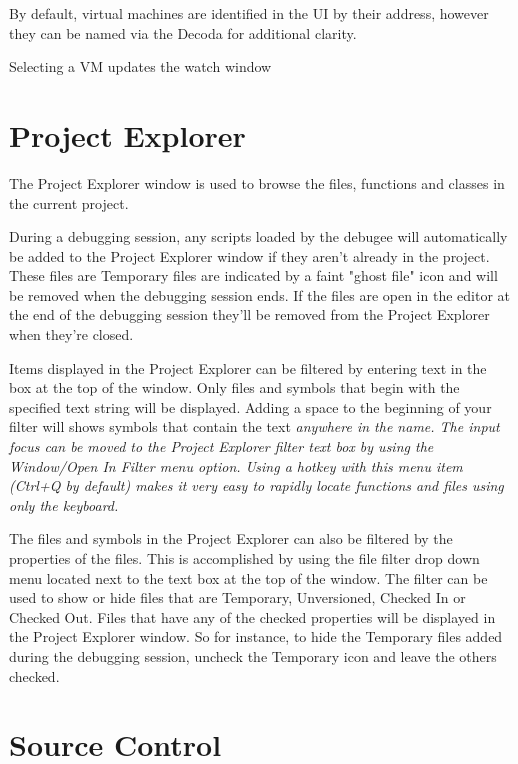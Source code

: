 By default, virtual machines are identified in the UI by their address, however they
can be named via the Decoda  for additional clarity.

Selecting a VM updates the watch window

\section{Project Explorer}\label{project_explorer}


The Project Explorer window is used to browse the files, functions and classes in
the current project.

During a debugging session, any scripts loaded by the debugee will automatically
be added to the Project Explorer window if they aren't already in the project. These
files are Temporary files are indicated by a faint "ghost file" icon and will be removed
when the debugging session ends.  If the files are open in the editor at the end of the
debugging session they'll be removed from the Project Explorer when they're closed.

Items displayed in the Project Explorer can be filtered by entering text in the box
at the top of the window. Only files and symbols that begin with the specified text
string will be displayed. Adding a space to the beginning of your filter will
shows symbols that contain the text \em{anywhere} in the name.  The input focus
can be moved to the Project Explorer filter text box by using the Window/Open In Filter
menu option. Using a hotkey with this menu item (Ctrl+Q by default) makes it very
easy to rapidly locate functions and files using only the keyboard.


The files and symbols in the Project Explorer can also be filtered by the properties
of the files. This is accomplished by using the file filter drop down menu located next
to the text box at the top of the window. The filter can be used to show or hide files
that are Temporary, Unversioned, Checked In or Checked Out. Files that have any of the
checked properties will be displayed in the Project Explorer window. So for instance,
to hide the Temporary files added during the debugging session, uncheck the Temporary
icon and leave the others checked.

\section{Source Control}\label{source_control}
%
%
\setfooter{\thepage}{}{}{}{}{\thepage}%

